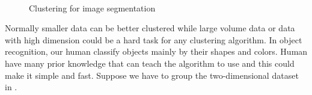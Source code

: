   \begin{figure}[ht]
    \hfill
    \\
    \hfill
    \caption{Clustering for image segmentation}
    \label{fig:cluster seg}
  \end{figure}
  
Normally smaller data can be better clustered while large volume data or data with high dimension could be a hard task for any clustering algorithm. In object recognition, our human classify objects mainly by their shapes and colors. Human have many prior knowledge that can teach the algorithm to use and this could make it simple and fast. Suppose we have to group the two-dimensional dataset in .

